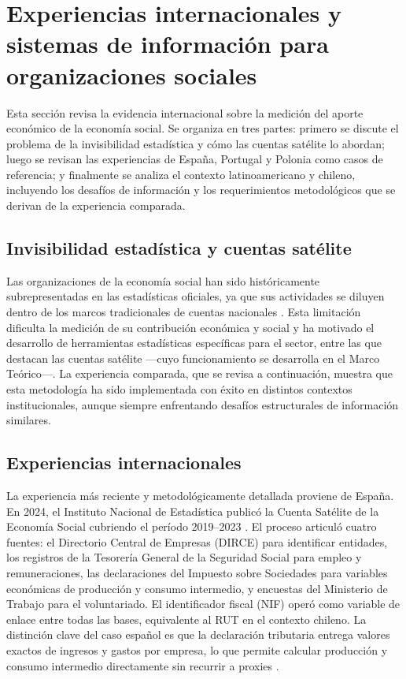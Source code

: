\section{Experiencias internacionales y sistemas de información para organizaciones
sociales}

Esta sección revisa la evidencia internacional sobre la medición del aporte económico
de la economía social. Se organiza en tres partes: primero se discute el problema de
la invisibilidad estadística y cómo las cuentas satélite lo abordan; luego se revisan
las experiencias de España, Portugal y Polonia como casos de referencia; y finalmente
se analiza el contexto latinoamericano y chileno, incluyendo los desafíos de
información y los requerimientos metodológicos que se derivan de la experiencia
comparada.

\subsection{Invisibilidad estadística y cuentas satélite}

Las organizaciones de la economía social han sido históricamente subrepresentadas en
las estadísticas oficiales, ya que sus actividades se diluyen dentro de los marcos
tradicionales de cuentas nacionales \cite{barea_tejeiro_manual_2007}. Esta limitación
dificulta la medición de su contribución económica y social y ha motivado el desarrollo
de herramientas estadísticas específicas para el sector, entre las que destacan las
cuentas satélite ---cuyo funcionamiento se desarrolla en el Marco Teórico---. La
experiencia comparada, que se revisa a continuación, muestra que esta metodología ha
sido implementada con éxito en distintos contextos institucionales, aunque siempre
enfrentando desafíos estructurales de información similares.

\subsection{Experiencias internacionales}

La experiencia más reciente y metodológicamente detallada proviene de España. En 2024,
el Instituto Nacional de Estadística publicó la Cuenta Satélite de la Economía Social
cubriendo el período 2019--2023 \cite{noauthor_cuenta_2024}. El proceso articuló
cuatro fuentes: el Directorio Central de Empresas (DIRCE) para identificar entidades,
los registros de la Tesorería General de la Seguridad Social para empleo y
remuneraciones, las declaraciones del Impuesto sobre Sociedades para variables
económicas de producción y consumo intermedio, y encuestas del Ministerio de Trabajo
para el voluntariado. El identificador fiscal (NIF) operó como variable de enlace
entre todas las bases, equivalente al RUT en el contexto chileno. La distinción clave
del caso español es que la declaración tributaria entrega valores exactos de ingresos
y gastos por empresa, lo que permite calcular producción y consumo intermedio
directamente sin recurrir a proxies \cite{noauthor_cuenta_2024}.

